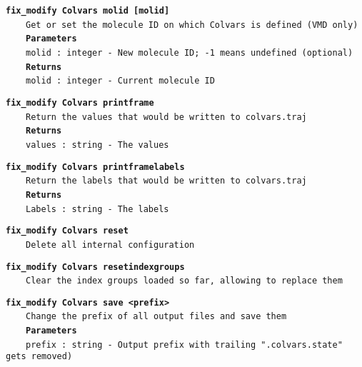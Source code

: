\begin{mdexampleinput}{}
\texttt{\textbf{fix\_modify Colvars molid [molid]}}
\\
\-~~~~\texttt{Get or set the molecule ID on which Colvars is defined (VMD only)}
\\
\-~~~~\texttt{\textbf{Parameters}}
\\
\-~~~~\texttt{molid : integer - New molecule ID; -1 means undefined (optional)}
\\
\-~~~~\texttt{\textbf{Returns}}
\\
\-~~~~\texttt{molid : integer - Current molecule ID}
\end{mdexampleinput}
\begin{mdexampleinput}{}
\texttt{\textbf{fix\_modify Colvars printframe}}
\\
\-~~~~\texttt{Return the values that would be written to colvars.traj}
\\
\-~~~~\texttt{\textbf{Returns}}
\\
\-~~~~\texttt{values : string - The values}
\end{mdexampleinput}
\begin{mdexampleinput}{}
\texttt{\textbf{fix\_modify Colvars printframelabels}}
\\
\-~~~~\texttt{Return the labels that would be written to colvars.traj}
\\
\-~~~~\texttt{\textbf{Returns}}
\\
\-~~~~\texttt{Labels : string - The labels}
\end{mdexampleinput}
\begin{mdexampleinput}{}
\texttt{\textbf{fix\_modify Colvars reset}}
\\
\-~~~~\texttt{Delete all internal configuration}
\end{mdexampleinput}
\begin{mdexampleinput}{}
\texttt{\textbf{fix\_modify Colvars resetindexgroups}}
\\
\-~~~~\texttt{Clear the index groups loaded so far, allowing to replace them}
\end{mdexampleinput}
\begin{mdexampleinput}{}
\texttt{\textbf{fix\_modify Colvars save <prefix>}}
\\
\-~~~~\texttt{Change the prefix of all output files and save them}
\\
\-~~~~\texttt{\textbf{Parameters}}
\\
\-~~~~\texttt{prefix : string - Output prefix with trailing ".colvars.state" gets removed)}
\end{mdexampleinput}
